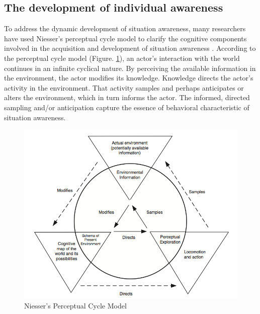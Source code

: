 \subsection{The development of individual awareness} %
\label{sub:awareness_as_process}
To address the dynamic development of situation awareness, many researchers have used Niesser's perceptual cycle model \cite{neisser1976cognition} to clarify the cognitive components involved in the acquisition and development of situation awareness \cite{Smith1995,Adams1995,Gutwin2002,Stanton2009}. According to the perceptual cycle model (Figure. \ref{fig:perceptual_cycle}), an actor's interaction with the world continues in an infinite cyclical nature. By perceiving the available information in the environment, the actor modifies its knowledge. Knowledge directs the actor's activity in the environment. That activity samples and perhaps anticipates or alters the environment, which in turn informs the actor. The informed, directed sampling and/or anticipation capture the essence of behavioral characteristic of situation awareness.

\begin{figure}[htbp] %
   \centering
   \includegraphics[width=5in]{perceptual_cycle.jpg} 
   \caption{Niesser's Perceptual Cycle Model \cite{Salmon2008}}
   \label{fig:perceptual_cycle}
\end{figure}

